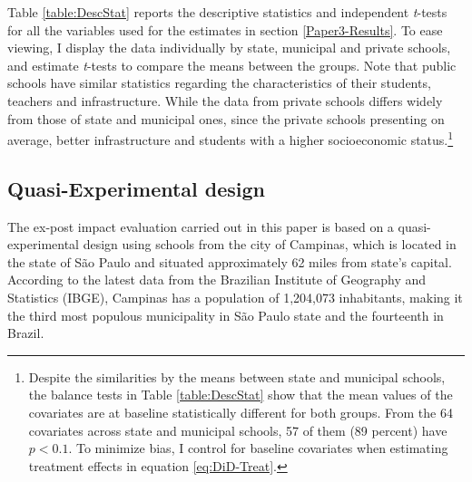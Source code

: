 \documentclass[a4paper, 12pt]{article}
\begin{document}
Table \ref{table:DescStat} reports the descriptive statistics and independent \textit{t}-tests for all the variables used for the estimates in section \ref{Paper3-Results}. To ease viewing, I display the data individually by state, municipal and private schools, and estimate \textit{t}-tests to compare the means between the groups. Note that public schools have similar statistics regarding the characteristics of their students, teachers and infrastructure. While the data from private schools differs widely from those of state and municipal ones, since the private schools presenting on average, better infrastructure and students with a higher socioeconomic status.\footnote{Despite the similarities by the means between state and municipal schools, the balance tests in Table \ref{table:DescStat} show that the mean values of the covariates are at baseline statistically different for both groups. From the 64 covariates across state and municipal schools, 57 of them (89 percent) have $p < 0.1$. To minimize bias, I control for baseline covariates when estimating treatment effects in equation \eqref{eq:DiD-Treat}.}






\subsection{Quasi-Experimental design} \label{Design}

The ex-post impact evaluation carried out in this paper is based on a quasi-experimental design using schools from the city of Campinas, which is located in the state of São Paulo and situated approximately 62 miles from state’s capital. According to the latest data from the Brazilian Institute of Geography and Statistics (IBGE), Campinas has a population of 1,204,073 inhabitants, making it the third most populous municipality in São Paulo state and the fourteenth in Brazil. 
\end{document}
